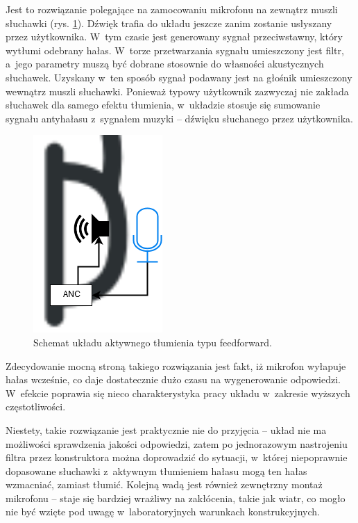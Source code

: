 Jest to rozwiązanie polegające na zamocowaniu mikrofonu na zewnątrz muszli słuchawki (rys. \ref{fig:feedforward}). Dźwięk trafia do układu jeszcze zanim zostanie usłyszany przez użytkownika. W~tym czasie jest generowany sygnał przeciwstawny, który wytłumi odebrany hałas. W~torze przetwarzania sygnału umieszczony jest filtr, a~jego parametry muszą być dobrane stosownie do własności akustycznych słuchawek. Uzyskany w~ten sposób sygnał podawany jest na głośnik umieszczony wewnątrz muszli słuchawki. Ponieważ typowy użytkownik zazwyczaj nie zakłada słuchawek dla samego efektu tłumienia, w~układzie stosuje się sumowanie sygnału antyhałasu z~sygnałem muzyki -- dźwięku słuchanego przez użytkownika.
\begin{figure}[h!]
	\centering
	\includegraphics[scale=0.7]{../Assets/feedforward.png}
	\caption{Schemat układu aktywnego tłumienia typu feedforward.}
	\label{fig:feedforward}
\end{figure}

Zdecydowanie mocną stroną takiego rozwiązania jest fakt, iż mikrofon wyłapuje hałas wcześnie, co daje dostatecznie dużo czasu na wygenerowanie odpowiedzi. W~efekcie poprawia się nieco charakterystyka pracy układu w~zakresie wyższych częstotliwości.

Niestety, takie rozwiązanie jest praktycznie nie do przyjęcia -- układ nie ma możliwości sprawdzenia jakości odpowiedzi, zatem po jednorazowym nastrojeniu filtra przez konstruktora można doprowadzić do sytuacji, w~której niepoprawnie dopasowane słuchawki z~aktywnym tłumieniem hałasu mogą ten hałas wzmacniać, zamiast tłumić. Kolejną wadą jest również zewnętrzny montaż mikrofonu -- staje się bardziej wrażliwy na zakłócenia, takie jak wiatr, co mogło nie być wzięte pod uwagę w~laboratoryjnych warunkach konstrukcyjnych.
